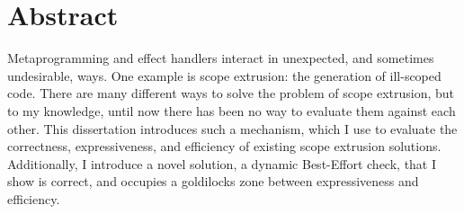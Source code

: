 \chapter*{Abstract}
Metaprogramming and effect handlers interact in unexpected, and sometimes undesirable, ways. One example is scope extrusion: the generation of ill-scoped code. There are many different ways to solve the problem of scope extrusion, but to my knowledge, until now there has been no way to evaluate them against each other. This dissertation introduces such a mechanism, which I use to evaluate the correctness, expressiveness, and efficiency of existing scope extrusion solutions. Additionally, I introduce a novel solution, a dynamic Best-Effort check, that I show is correct, and occupies a goldilocks zone between expressiveness and efficiency. 